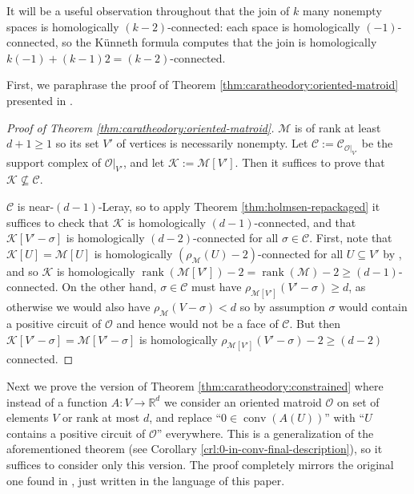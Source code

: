 \documentclass[a4paper,11pt,reqno, english]{amsart}
\theoremstyle{definition}
\theoremstyle{remark}
\newcommand\R{\mathbb R}
\DeclareMathOperator{\conv}{\mathrm{conv}}
\begin{document}
It will be a useful observation throughout that the join of $k$ many nonempty spaces is homologically $(k-2)$-connected: each space is homologically $(-1)$-connected, so the K\"unneth formula computes that the join is homologically $k(-1)+(k-1)2=(k-2)$-connected.


First, we paraphrase the proof of Theorem \ref{thm:caratheodory:oriented-matroid} presented in \cite{Holmsen2016}.
\begin{proof}[Proof of Theorem \ref{thm:caratheodory:oriented-matroid}]
    $\mathscr{M}$ is of rank at least $d+1\geq 1$ so its set $V'$ of vertices is necessarily nonempty. Let $\mathscr{C}:=\mathscr{C}_{\mathscr{O}|_{V'}}$ be the support complex of $\mathscr{O}|_{V'}$, and let $\mathscr{K}:=\mathscr{M}[V']$. Then it suffices to prove that $\mathscr{K}\nsubseteq\mathscr{C}$.

    $\mathscr{C}$ is near-$(d-1)$-Leray, so to apply Theorem \ref{thm:holmsen-repackaged} it suffices to check that $\mathscr{K}$ is homologically $(d-1)$-connected, and that $\mathscr{K}[V'-\sigma]$ is homologically $(d-2)$-connected for all $\sigma\in\mathscr{C}$. First, note that $\mathscr{K}[U]=\mathscr{M}[U]$ is homologically $(\rho_\mathscr{M}(U)-2)$-connected for all $U\subseteq V'$ by \cite[Lemma 3.2]{Holmsen2016}, and so $\mathscr{K}$ is homologically $\operatorname{rank}(\mathscr{M}[V'])-2=\operatorname{rank}(\mathscr{M})-2\geq (d-1)$-connected. On the other hand, $\sigma\in\mathscr{C}$ must have $\rho_{\mathscr{M}[V']}(V'-\sigma)\geq d$, as otherwise we would also have $\rho_\mathscr{M}(V-\sigma)<d$ so by assumption $\sigma$ would contain a positive circuit of $\mathscr{O}$ and hence would not be a face of $\mathscr{C}$. But then $\mathscr{K}[V'-\sigma]=\mathscr{M}[V'-\sigma]$ is homologically $\rho_{\mathscr{M}[V']}(V'-\sigma)-2\geq (d-2)$ connected.
\end{proof}
Next we prove the version of Theorem \ref{thm:caratheodory:constrained} where instead of a function $A\colon V\to\R^d$ we consider an oriented matroid $\mathscr{O}$ on set of elements $V$ or rank at most $d$, and replace ``$0\in\conv(A(U))$'' with ``$U$ contains a positive circuit of $\mathscr{O}$'' everywhere. This is a generalization of the aforementioned theorem (see Corollary \ref{crl:0-in-conv-final-description}), so it suffices to consider only this version. The proof completely mirrors the original one found in \cite{Blagojevic2025}, just written in the language of this paper.
\end{document}
